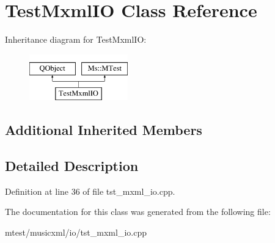 \hypertarget{class_test_mxml_i_o}{}\section{Test\+Mxml\+IO Class Reference}
\label{class_test_mxml_i_o}
Inheritance diagram for Test\+Mxml\+IO\+:\begin{figure}[H]
\begin{center}
\leavevmode
\includegraphics[height=2.000000cm]{class_test_mxml_i_o}
\end{center}
\end{figure}
\subsection*{Additional Inherited Members}


\subsection{Detailed Description}


Definition at line 36 of file tst\+\_\+mxml\+\_\+io.\+cpp.



The documentation for this class was generated from the following file\+:\begin{DoxyCompactItemize}
\item 
mtest/musicxml/io/tst\+\_\+mxml\+\_\+io.\+cpp\end{DoxyCompactItemize}
